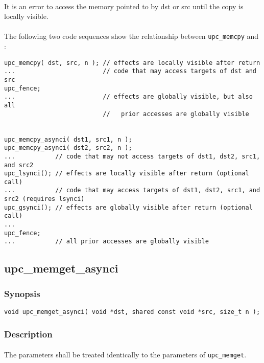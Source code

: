 \documentclass[10pt]{article}
\def \memcpy  {{\tt upc\_memcpy}}
\def \memget  {{\tt upc\_memget}}
\begin{document}
\paragraph{} It is an error to access the memory pointed to by dst or src until
the copy is locally visible.

\paragraph{} The following two code sequences show the relationship between
\memcpy{} and \function{}:

\begin{verbatim}
upc_memcpy( dst, src, n ); // effects are locally visible after return
...                        // code that may access targets of dst and src
upc_fence;                 
...                        // effects are globally visible, but also all
                           //   prior accesses are globally visible


upc_memcpy_asynci( dst1, src1, n );
upc_memcpy_asynci( dst2, src2, n );
...           // code that may not access targets of dst1, dst2, src1, and src2
upc_lsynci(); // effects are locally visible after return (optional call)
...           // code that may access targets of dst1, dst2, src1, and src2 (requires lsynci)
upc_gsynci(); // effects are globally visible after return (optional call)
...
upc_fence;
...           // all prior accesses are globally visible
\end{verbatim}

\newpage
\subsection{upc\_memget\_asynci}
\def\function{{\tt upc\_memget\_asynci}}

\subsubsection{Synopsis}

\begin{verbatim}
void upc_memget_asynci( void *dst, shared const void *src, size_t n );
\end{verbatim}

\subsubsection{Description}

\paragraph{} The parameters shall be treated identically to the parameters of
\memget{}.
\end{document}
